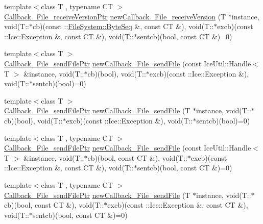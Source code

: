 \begin{DoxyCompactItemize}
{\footnotesize template$<$class T , typename C\+T $>$ }\\\hyperlink{namespace_file_system_a9f139d463637347415d1d3dadefe9bad}{Callback\+\_\+\+File\+\_\+receive\+Version\+Ptr} \hyperlink{namespace_file_system_adf4cdf405caaf42582f7d55bf48d5702}{new\+Callback\+\_\+\+File\+\_\+receive\+Version} (T $\ast$instance, void(T\+::$\ast$cb)(const \+::\hyperlink{namespace_file_system_a5c85de065f9c451ae1d1dea2dacb68c5}{File\+System\+::\+Byte\+Seq} \&, const C\+T \&), void(T\+::$\ast$excb)(const \+::Ice\+::\+Exception \&, const C\+T \&), void(T\+::$\ast$sentcb)(bool, const C\+T \&)=0)
\item 
{\footnotesize template$<$class T $>$ }\\\hyperlink{namespace_file_system_aa10040959d9776f7f500f38a2567b56e}{Callback\+\_\+\+File\+\_\+send\+File\+Ptr} \hyperlink{namespace_file_system_a19a234cedd70c1fd80bb5f5c842c3041}{new\+Callback\+\_\+\+File\+\_\+send\+File} (const Ice\+Util\+::\+Handle$<$ T $>$ \&instance, void(T\+::$\ast$cb)(bool), void(T\+::$\ast$excb)(const \+::Ice\+::\+Exception \&), void(T\+::$\ast$sentcb)(bool)=0)
\item 
{\footnotesize template$<$class T $>$ }\\\hyperlink{namespace_file_system_aa10040959d9776f7f500f38a2567b56e}{Callback\+\_\+\+File\+\_\+send\+File\+Ptr} \hyperlink{namespace_file_system_a940c86675dd438dacf7618250756a3c0}{new\+Callback\+\_\+\+File\+\_\+send\+File} (T $\ast$instance, void(T\+::$\ast$cb)(bool), void(T\+::$\ast$excb)(const \+::Ice\+::\+Exception \&), void(T\+::$\ast$sentcb)(bool)=0)
\item 
{\footnotesize template$<$class T , typename C\+T $>$ }\\\hyperlink{namespace_file_system_aa10040959d9776f7f500f38a2567b56e}{Callback\+\_\+\+File\+\_\+send\+File\+Ptr} \hyperlink{namespace_file_system_a018b94a8e4bb414a2eb5b880dfd2309d}{new\+Callback\+\_\+\+File\+\_\+send\+File} (const Ice\+Util\+::\+Handle$<$ T $>$ \&instance, void(T\+::$\ast$cb)(bool, const C\+T \&), void(T\+::$\ast$excb)(const \+::Ice\+::\+Exception \&, const C\+T \&), void(T\+::$\ast$sentcb)(bool, const C\+T \&)=0)
\item 
{\footnotesize template$<$class T , typename C\+T $>$ }\\\hyperlink{namespace_file_system_aa10040959d9776f7f500f38a2567b56e}{Callback\+\_\+\+File\+\_\+send\+File\+Ptr} \hyperlink{namespace_file_system_a617605b6d0e9224ad5d7d424600651da}{new\+Callback\+\_\+\+File\+\_\+send\+File} (T $\ast$instance, void(T\+::$\ast$cb)(bool, const C\+T \&), void(T\+::$\ast$excb)(const \+::Ice\+::\+Exception \&, const C\+T \&), void(T\+::$\ast$sentcb)(bool, const C\+T \&)=0)

\end{DoxyCompactItemize}
